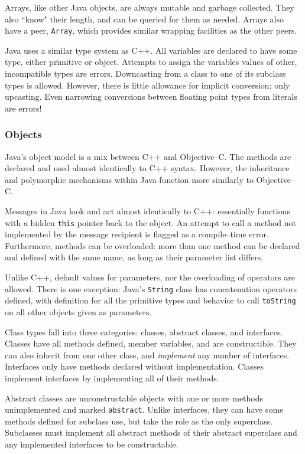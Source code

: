 Arrays, like other Java objects, are always mutable and garbage collected.
They also ``know" their length, and can be queried for them as needed. Arrays
also have a peer, \texttt{Array}, which provides similar wrapping facilities
as the other peers.

Java uses a similar type system as C++. All variables are declared to have
some type, either primitive or object. Attempts to assign the variables values
of other, incompatible types are errors. Downcasting from a class to one of
its subclass types is allowed. However, there is little allowance for implicit
conversion; only upcasting. Even narrowing conversions between floating point
types from literals are errors!

\subsubsection{Objects}

Java's object model is a mix between C++ and Objective--C. The methods are
declared and used almost identically to C++ syntax. However, the inheritance
and polymorphic mechanisms within Java function more similarly to
Objective--C.

Messages in Java look and act almost identically to C++: essentially functions
with a hidden \texttt{this} pointer back to the object. An attempt to call a
method not implemented by the message recipient is flagged as a compile--time
error. Furthermore, methods can be overloaded: more than one method can be
declared and defined with the same name, as long as their parameter list
differs.

Unlike C++, default values for parameters, nor the overloading of operators
are allowed. There is one exception: Java's \texttt{String} class has
concatenation operators defined, with definition for all the primitive types
and behavior to call \texttt{toString} on all other objects given as
parameters.

Class types fall into three categories: classes, abstract classes, and
interfaces. Classes have all methods defined, member variables, and are
constructible. They can also inherit from one other class, and
\emph{implement} any number of interfaces. Interfaces only have methods
declared without implementation. Classes implement interfaces by implementing
all of their methods.

Abstract classes are unconstructable objects with one or more methods
unimplemented and marked \texttt{abstract}. Unlike interfaces, they can have
some methods defined for subclass use, but take the role as the only
superclass. Subclasses must implement all abstract methods of their abstract
superclass and any implemented interfaces to be constructable.

